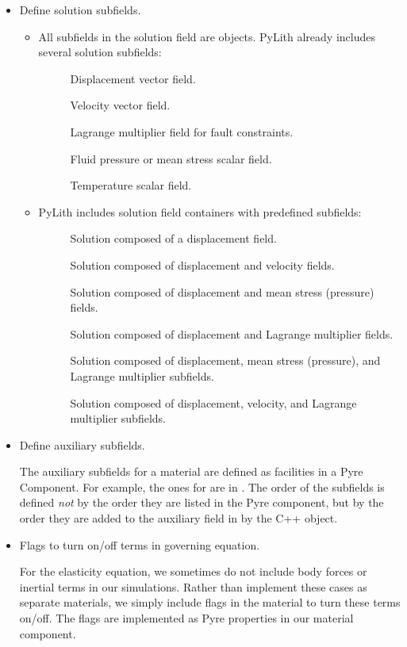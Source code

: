 \begin{itemize}
\item Define solution subfields.

  \begin{itemize}
  \item All subfields in the solution field are 
    objects. PyLith already includes several solution subfields:
    \begin{description}
    \item[] Displacement vector field.
    \item[] Velocity vector field.
    \item[] Lagrange multiplier field for
      fault constraints.
    \item[] Fluid pressure or mean stress scalar field.
    \item[] Temperature scalar field.
    \end{description}
  \item PyLith includes solution field containers with predefined
    subfields:
    \begin{description}
    \item[] Solution composed of a displacement field.
    \item[] Solution composed of displacement and velocity fields.
    \item[] Solution composed of displacement and
      mean stress (pressure) fields.
    \item[] Solution composed of displacement
      and Lagrange multiplier fields.
    \item[] Solution composed of
      displacement, mean stress (pressure), and Lagrange multiplier subfields.
    \item[] Solution composed of
      displacement, velocity, and Lagrange multiplier subfields.
    \end{description}
  \end{itemize}
%
\item Define auxiliary subfields.

  The auxiliary subfields for a material are defined as facilities in
  a Pyre Component. For example, the ones for
   are in
  . The order of the subfields
  is defined {\em not} by the order they are listed in the Pyre
  component, but by the order they are added to the auxiliary field in
  by the C++ object.

\item Flags to turn on/off terms in governing equation.

  For the elasticity equation, we sometimes do not include body forces
  or inertial terms in our simulations. Rather than implement these
  cases as separate materials, we simply include flags in the material
  to turn these terms on/off. The flags are implemented as Pyre
  properties in our material component.
\end{itemize}
